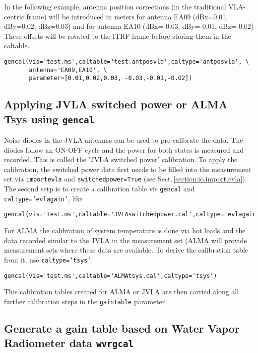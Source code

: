 {In the following example, antenna position corrections (in the
traditional VLA-centric frame) will be introduced in meters for
antenna EA09 (dBx=0.01, dBy=0.02, dBz=0.03) and for antenna EA10
(dBx=-0.03, dBy=-0.01, dBz=-0.02) These offsets will be rotated to the
ITRF frame before storing them in the caltable.

\small
\begin{verbatim}
gencal(vis='test.ms',caltable='test.antposvla',caltype='antposvla', \
       antenna='EA09,EA10', \
       parameter=[0.01,0.02,0.03, -0.03,-0.01,-0.02])
\end{verbatim}
\normalsize
\subsection{Applying JVLA switched power  or ALMA Tsys
   using {\tt gencal}}
\label{section:cal.prior.gencalevlagains}
Noise diodes in the JVLA antennas can be used to pre-calibrate the
data. The diodes follow an ON-OFF cycle and the power for both states is
measured and recorded. This is called the 'JVLA switched power'
calibration. To apply the calibration, the switched power data first needs to be
filled into the measurement set via {\tt importevla} and {\tt switchedpower=True}
(see Sect.\,\ref{section:io.import.evla}). The second setp is to
create a calibration table vis {\tt gencal} and {\tt
  caltype='evlagain'}, like 

\small
\begin{verbatim}
gencal(vis='test.ms',caltable='JVLAswitchedpower.cal',caltype='evlagain')
\end{verbatim}
\normalsize

For ALMA the calibration of system temperature is done via hot loads
and the data recorded similar to the JVLA in the measurement set (ALMA
will provide measurement sets where these data are available. To
derive the calibration table from it, use {\tt caltype='tsys'}:

\small
\begin{verbatim}
gencal(vis='test.ms',caltable='ALMAtsys.cal',caltype='tsys')
\end{verbatim}
\normalsize


This calibration tables created for ALMA or JVLA are then carried
along all further calibration steps in the {\tt gaintable} parameter.

\subsection{ Generate a gain table based on Water Vapor Radiometer data {\tt wvrgcal}}
\label{section:cal.prior.wvrgcal}

}
